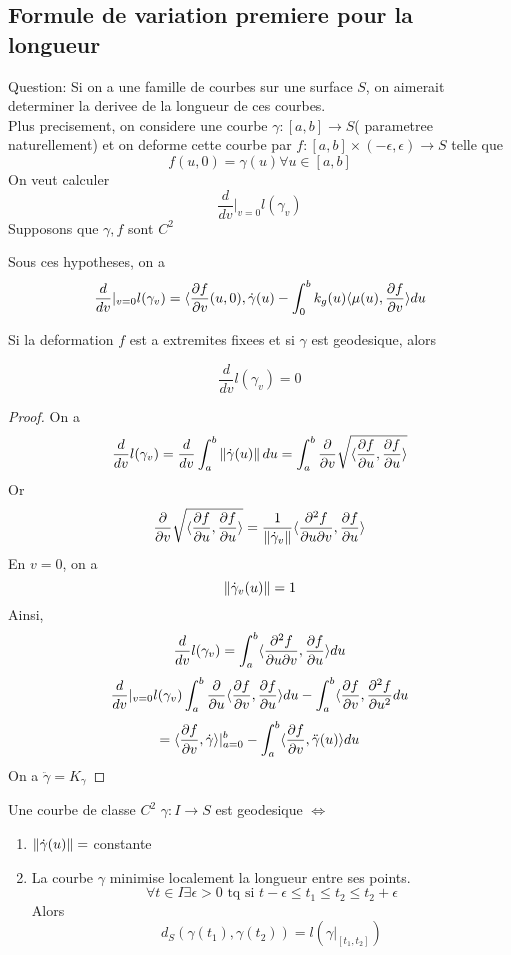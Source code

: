 \documentclass[../main.tex]{subfiles}
\begin{document}
\subsection{Formule de variation premiere pour la longueur}
Question: Si on a une famille de courbes sur une surface $S$, on aimerait determiner la derivee de la longueur de ces courbes.\\
Plus precisement, on considere une courbe $\gamma: [ a,b] \to S$( parametree naturellement) et on deforme cette courbe par $f: [ a,b] \times ( -\epsilon,\epsilon) \to S$ telle que 
\[ 
f( u,0) = \gamma( u) \forall u\in [  a,b]
\]
On veut calculer 
\[ 
\frac{d}{dv}|_{v=0} l( \gamma_v) 
\]
Supposons que $\gamma,f$ sont $C^{2}$ 
\begin{thm}
	Sous ces hypotheses, on a 
	\[ 
	\frac{d}{dv}|_{v=0} l( \gamma_v) = \langle \frac{\partial f}{\partial v}( u,0) ,\dot\gamma( u) - \int_{ 0 }^{ b } k_g( u) \langle \mu( u) , \frac{\partial f}{\partial v}\rangle du
	\]
		
\end{thm}
\begin{crly}
Si la deformation $f$ est a extremites fixees et si $\gamma$ est geodesique, alors

\[ 
\frac{d}{dv}l( \gamma_v) = 0
\]

\end{crly}
\begin{proof}
On a 
\[ 
\frac{d}{dv}l( \gamma_v) = \frac{d}{dv} \int_{ a }^{ b }\left\lVert \dot\gamma( u) \right\rVert du = \int_{ a }^{ b } \frac{\partial}{\partial v} \sqrt { \langle \frac{\partial f}{\partial u}, \frac{\partial f}{\partial u}\rangle}
\]
Or
\[ 
\frac{\partial}{\partial v} \sqrt{\langle \frac{\partial f}{\partial u}, \frac{\partial f}{\partial u}\rangle}  = \frac{1}{\left\lVert \dot\gamma_v\right\rVert }\langle \frac{\partial ^{2}f}{\partial u \partial v}, \frac{\partial f}{\partial u}\rangle
\]
En $v=0$, on a 
\[ 
\left\lVert \dot\gamma_v( u) \right\rVert =1
\]
Ainsi,
\[ 
\frac{d}{dv}l( \gamma_v) = \int_{ a }^{ b }\langle \frac{\partial ^{2}f}{\partial u \partial v}, \frac{\partial f}{\partial u}\rangle du
\]
\[ 
\frac{d}{dv}\vert_{v=0}  l( \gamma_v ) \int_{ a }^{ b }\frac{\partial }{\partial u}\langle \frac{\partial f}{\partial v}, \frac{\partial f}{\partial u}\rangle du - \int_{ a }^{ b }\langle\frac{\partial f}{\partial v}, \frac{\partial^{2}f}{\partial u ^{2}} du
\]
\[ 
= \langle \frac{\partial f}{\partial v}, \dot\gamma\rangle \vert_{a=0}^{b}- \int_{ a }^{ b } \langle \frac{\partial f}{\partial v}, \ddot\gamma( u) \rangle du
\]
On a $\ddot\gamma = K_\gamma$ 	
\end{proof}
\begin{crly}
Une courbe de classe $C^{2}$ $\gamma:I\to S$ est geodesique $\iff$ 
\begin{enumerate}
\item $\left\lVert \dot\gamma( u) \right\rVert = $ constante
\item La courbe $\gamma$ minimise localement la longueur entre ses points.
	\[ 
	\forall t \in I \exists \epsilon>0 \text{ tq si } t-\epsilon \leq t_1 \leq t_2 \leq t_2+ \epsilon
	\]
	Alors
	\[ 
	d_S( \gamma( t_1), \gamma( t_2) ) = l( \gamma|_{[t_1,t_2]} ) 
	\]
	
	
\end{enumerate}

\end{crly}
\end{document}
